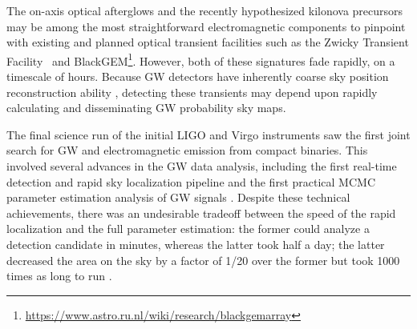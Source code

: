\documentclass[amsmath,amssymb,aps,prx,reprint,nopreprintnumbers,nofootinbib]{revtex4-1}
\begin{document}
The on\nobreakdashes-axis optical afterglows and the recently hypothesized kilonova precursors \cite{KilonovaPrecursor} may be among the most straightforward electromagnetic components to pinpoint with existing and planned optical transient facilities such as the Zwicky Transient Facility~\citep{ZTF} and BlackGEM\footnote{\url{https://www.astro.ru.nl/wiki/research/blackgemarray}}. However, both of these signatures fade rapidly, on a timescale of hours. Because \ac{GW} detectors have inherently coarse sky position reconstruction ability \cite{FairhurstTriangulation,WenLocalizationAdvancedLIGO,FairhurstLocalizationAdvancedLIGO,2011PhRvD..84j4020V,RodriguezBasicParameterEstimation,NissankeLocalization,NissankeKasliwalEMCounterparts,KasliwalTwoDetectors,Grover:2013,SiderySkyLocalizationComparison,FirstTwoYears}, detecting these transients may depend upon rapidly calculating and disseminating \ac{GW} probability sky maps.

The final science run of the initial LIGO and Virgo instruments saw the first joint search for \ac{GW} and electromagnetic emission from compact binaries. This involved several advances in the \ac{GW} data analysis, including the first real\nobreakdashes-time detection and rapid sky localization pipeline \cite{abadie2012first} and the first practical \ac{MCMC} parameter estimation analysis of \ac{GW} signals \cite{S6PE}. Despite these technical achievements, there was an undesirable tradeoff between the speed of the rapid localization and the full parameter estimation: the former could analyze a detection candidate in minutes, whereas the latter took half a day; the latter decreased the area on the sky by a factor of 1/20 over the former but took 1000 times as long to run \cite{SiderySkyLocalizationComparison}.
\end{document}
